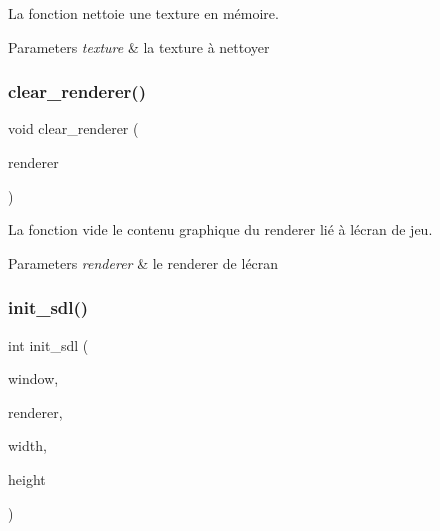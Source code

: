 La fonction nettoie une texture en mémoire. 


\begin{DoxyParams}{Parameters}
{\em texture} & la texture à nettoyer \\
\hline
\end{DoxyParams}
\mbox{\label{sdl2-light_8c_a572bf07064fc55f12238e71ba2930f5f}} 
\subsubsection{\texorpdfstring{clear\+\_\+renderer()}{clear\_renderer()}}
{\footnotesize\ttfamily void clear\+\_\+renderer (\begin{DoxyParamCaption}\item[{S\+D\+L\+\_\+\+Renderer $\ast$}]{renderer }\end{DoxyParamCaption})}



La fonction vide le contenu graphique du renderer lié à l\textquotesingle{}écran de jeu. 


\begin{DoxyParams}{Parameters}
{\em renderer} & le renderer de l\textquotesingle{}écran \\
\hline
\end{DoxyParams}
\mbox{\label{sdl2-light_8c_a7307299b4ef47feaa1a4e95341a04c7a}} 
\subsubsection{\texorpdfstring{init\+\_\+sdl()}{init\_sdl()}}
{\footnotesize\ttfamily int init\+\_\+sdl (\begin{DoxyParamCaption}\item[{S\+D\+L\+\_\+\+Window $\ast$$\ast$}]{window,  }\item[{S\+D\+L\+\_\+\+Renderer $\ast$$\ast$}]{renderer,  }\item[{int}]{width,  }\item[{int}]{height }\end{DoxyParamCaption})}



